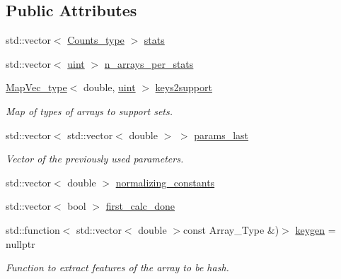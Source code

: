 \subsection*{Public Attributes}
\begin{DoxyCompactItemize}
\item 
std\+::vector$<$ \hyperlink{typedefs_8hpp_aee40fa17c1fddb63dd1f2b1470ade95b}{Counts\+\_\+type} $>$ \hyperlink{class_model_abd7e36250a681bd2ade69d087e8200e1}{stats}
\item 
std\+::vector$<$ \hyperlink{typedefs_8hpp_a91ad9478d81a7aaf2593e8d9c3d06a14}{uint} $>$ \hyperlink{class_model_a410caeff58afe605520c878a0689abf5}{n\+\_\+arrays\+\_\+per\+\_\+stats}
\item 
\hyperlink{typedefs_8hpp_a02ed8dec96bc528c8bc3d8cb3c4674a5}{Map\+Vec\+\_\+type}$<$ double, \hyperlink{typedefs_8hpp_a91ad9478d81a7aaf2593e8d9c3d06a14}{uint} $>$ \hyperlink{class_model_a2a81190ac618b04479686411d02b3c5f}{keys2support}
\begin{DoxyCompactList}\small\item\em Map of types of arrays to support sets. \end{DoxyCompactList}\item 
std\+::vector$<$ std\+::vector$<$ double $>$ $>$ \hyperlink{class_model_add8183af946f2871480b6a6f9f1c8013}{params\+\_\+last}
\begin{DoxyCompactList}\small\item\em Vector of the previously used parameters. \end{DoxyCompactList}\item 
std\+::vector$<$ double $>$ \hyperlink{class_model_aa4479d146005e89350dad6ba7bd8121a}{normalizing\+\_\+constants}
\item 
std\+::vector$<$ bool $>$ \hyperlink{class_model_a942b2cdb7472878fa17c5068680441c6}{first\+\_\+calc\+\_\+done}
\item 
std\+::function$<$ std\+::vector$<$ double $>$const Array\+\_\+\+Type \&)$>$ \hyperlink{class_model_a16561e15c0abbb080927382b30d43e35}{keygen} = nullptr
\begin{DoxyCompactList}\small\item\em Function to extract features of the array to be hash. \end{DoxyCompactList}\end{DoxyCompactItemize}
